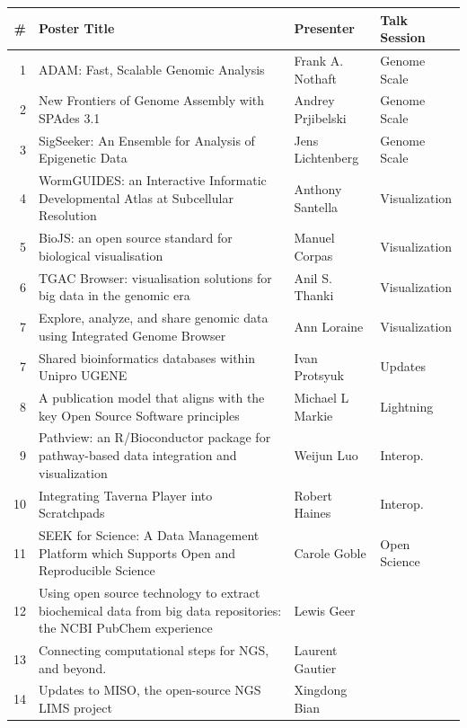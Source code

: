 \documentclass[12pt,oneside]{article}
\begin{document}
\begin{center}
\begin{tabular}{|r|p{10.5cm}|p{3.2cm}|p{2.5cm}|}
\hline
\# & Poster Title & Presenter & Talk Session \\
\hline
1 & ADAM: Fast, Scalable Genomic Analysis & Frank A. Nothaft & Genome Scale \\
2 & New Frontiers of Genome Assembly with SPAdes 3.1 & Andrey Prjibelski & Genome Scale \\
3 & SigSeeker: An Ensemble for Analysis of Epigenetic Data & Jens Lichtenberg & Genome Scale \\
4 & WormGUIDES: an Interactive Informatic Developmental Atlas at Subcellular Resolution & Anthony Santella & Visualization \\
5 & BioJS: an open source standard for biological visualisation & Manuel Corpas & Visualization \\
6 & TGAC Browser: visualisation solutions for big data in the genomic era & Anil S. Thanki & Visualization \\
7 & Explore, analyze, and share genomic data using Integrated Genome Browser & Ann Loraine & Visualization \\
7 & Shared bioinformatics databases within Unipro UGENE & Ivan Protsyuk & Updates \\
8 & A publication model that aligns with the key Open Source Software principles & Michael L Markie & Lightning \\
9 & Pathview: an R/Bioconductor package for pathway-based data integration and visualization & Weijun Luo & Interop. \\
10 & Integrating Taverna Player into Scratchpads & Robert Haines & Interop. \\
11 & SEEK for Science: A Data Management Platform which Supports Open and Reproducible Science & Carole Goble & Open Science \\
\hline
12 & Using open source technology to extract biochemical data from big data repositories: the NCBI PubChem experience & Lewis Geer &  \\
13 & Connecting computational steps for NGS, and beyond. & Laurent Gautier &  \\
14 & Updates to MISO, the open-source NGS LIMS project & Xingdong Bian &  \\

\end{tabular}
\end{center}
\end{document}
